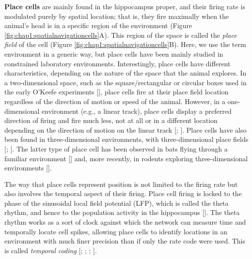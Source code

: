 \textbf{Place cells} are mainly found in the hippocampus proper, and their firing rate is modulated purely by spatial location; that is, they fire maximally when the animal's head is in a specific region of the environment (Figure \ref{fig:chap1:spatialnavigationcells}A). 
This region of the space is called the \textit{place field} of the cell (Figure \ref{fig:chap1:spatialnavigationcells}B).  
Here, we use the term environment in a generic way, but place cells have been mainly studied in constrained laboratory environments.
Interestingly, place cells have different characteristics, depending on the nature of the space that the animal explores.
In a two-dimensional space, such as the square/rectangular or circular boxes used in the early O'Keefe experiments [\cite{okeefe1976}], place cells fire at their place field location regardless of the direction of motion or speed of the animal.
However, in a one-dimensional environment (e.g., a linear track), place cells display a preferred direction of firing and fire much less, not at all or in a different location depending on the direction of motion on the linear track [\cite{mcnaughton1983}; \cite{okeefe1993}].
Place cells have also been found in three-dimensional environments, with three-dimensional place fields [\cite{yartsev2013}; \cite{grieves2020}].
The latter type of place cell has been observed in bats flying through a familiar environment [\cite{yartsev2013}] and, more recently, in rodents exploring three-dimensional environments [\cite{grieves2020}].

The way that place cells represent position is not limited to the firing rate but also involves the temporal aspect of their firing. 
Place cell firing is locked to the phase of the sinusoidal local field potential (LFP), which is called the theta rhythm, and hence to the population activity in the hippocampus [\cite{okeefe1993}].
The theta rhythm works as a sort of clock against which the network can measure time and temporally locate cell spikes, allowing place cells to identify locations in an environment with much finer precision than if only the rate code were used.
This is called \textit{temporal coding} [\cite{okeefe1993}; \cite{huxter2003}; \cite{buzsaki2004}; \cite{buzsaki2002}].

